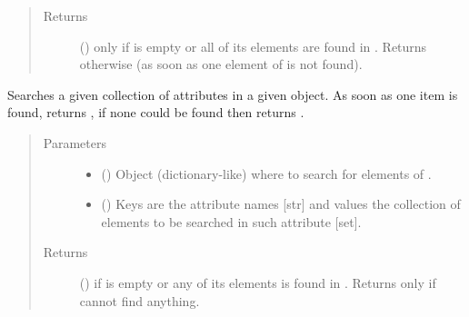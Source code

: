 \documentclass[letterpaper,10pt,english]{sphinxmanual}
\begin{document}
\begin{fulllineitems}
\begin{fulllineitems}
\begin{quote}
\begin{description}
\begin{itemize}
\end{itemize}

\item[{Returns}] \leavevmode
() \textendash{}  only if  is empty or all of its
elements are found in . Returns  otherwise (as
soon as one element of  is not found).

\end{description}\end{quote}

\end{fulllineitems}


\begin{fulllineitems}
\label{\detokenize{main:pypath.main.PyPath.search_attr_or}}
Searches a given collection of attributes in a given object. As
soon as one item is found, returns , if none could be
found then returns .
\begin{quote}\begin{description}
\item[{Parameters}] \leavevmode\begin{itemize}
\item {} 
 () \textendash{} Object (dictionary-like) where to search for elements of
.

\item {} 
 () \textendash{} Keys are the attribute names {[}str{]} and values the collection
of elements to be searched in such attribute {[}set{]}.

\end{itemize}

\item[{Returns}] \leavevmode
() \textendash{}  if  is empty or any of its
elements is found in . Returns only  if cannot
find anything.


\end{description}
\end{quote}
\end{fulllineitems}
\end{fulllineitems}
\end{document}
